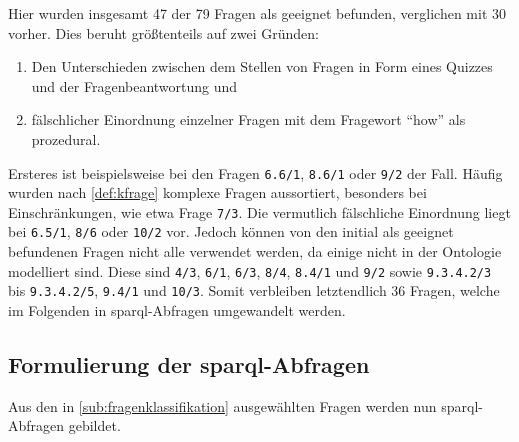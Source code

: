 Hier wurden insgesamt 47 der 79 Fragen als geeignet befunden, verglichen mit 30 vorher.
Dies beruht größtenteils auf zwei Gründen:
\begin{enumerate}
  \item Den Unterschieden zwischen dem Stellen von Fragen in Form eines Quizzes und der Fragenbeantwortung und
  \item fälschlicher Einordnung einzelner Fragen mit dem Fragewort \enquote{how} als prozedural.
\end{enumerate}
Ersteres ist beispielsweise bei den Fragen \texttt{6.6/1}, \texttt{8.6/1} oder \texttt{9/2} der Fall.
Häufig wurden nach \cref{def:kfrage} komplexe Fragen aussortiert, besonders bei Einschränkungen, wie etwa Frage \texttt{7/3}.
Die vermutlich fälschliche Einordnung liegt bei \texttt{6.5/1}, \texttt{8/6} oder \texttt{10/2} vor.
Jedoch können von den initial als geeignet befundenen Fragen nicht alle verwendet werden, da einige nicht in der Ontologie modelliert sind.
Diese sind \texttt{4/3}, \texttt{6/1}, \texttt{6/3}, \texttt{8/4}, \texttt{8.4/1} und \texttt{9/2} sowie \texttt{9.3.4.2/3} bis \texttt{9.3.4.2/5}, \texttt{9.4/1} und \texttt{10/3}.
Somit verbleiben letztendlich 36 Fragen, welche im Folgenden in \ac{sparql}-Abfragen umgewandelt werden.

\subsection[Formulierung der SPARQL-Abfragen]{Formulierung der \ac{sparql}-Abfragen}

Aus den in \cref{sub:fragenklassifikation} ausgewählten Fragen werden nun \ac{sparql}-Abfragen gebildet.

